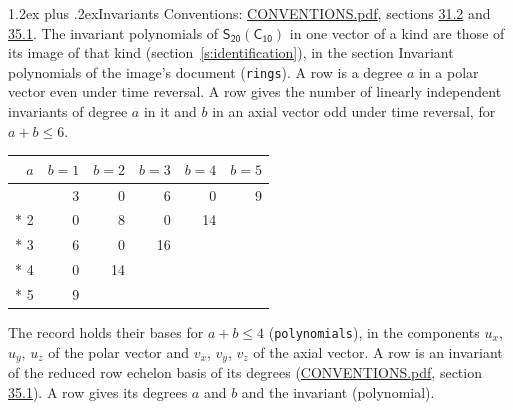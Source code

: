 \documentclass[10pt,a4paper]{article}
\makeatletter
\renewcommand\section{\@startsection{section}{1}{\z@}{-3ex plus -1ex minus -.2ex}%
  {1.2ex plus .2ex}{\normalfont\large\sffamily\bfseries\color{parttitle}}}
\numberwithin{equation}{section}
\newcommand{\grp}[1]{\mathsf{#1}}
\makeatother
\begin{document}
\section{Invariants}\label{s:invariants}
Conventions: \href{../../CONVENTIONS.pdf}{CONVENTIONS.pdf}, sections \href{../../CONVENTIONS.pdf\#conv.31.2}{31.2} and \href{../../CONVENTIONS.pdf\#conv.35.1}{35.1}.
The invariant polynomials of $\grp{S_{20}}(\grp{C_{10}})$ in one vector of a kind are those of its image of that kind (section~\ref{s:identification}), in the section Invariant polynomials of the image's document (\texttt{rings}).
\leavevmode\label{n:index.degree.polar}\label{n:index.degree.axial}A row is a degree $a$ in a polar vector even under time reversal. A row gives the number of linearly independent invariants of degree $a$ in it and $b$ in an axial vector odd under time reversal, for $a + b \le 6$.
{\small\begin{longtable}{@{}rrrrrr@{}}\toprule
$a$ & $b = 1$ & $b = 2$ & $b = 3$ & $b = 4$ & $b = 5$\\\midrule\endhead
\bottomrule\endfoot\endlastfoot
1 & 3 & 0 & 6 & 0 & 9\\*
2 & 0 & 8 & 0 & 14 & \\*
3 & 6 & 0 & 16 &  & \\*
4 & 0 & 14 &  &  & \\*
5 & 9 &  &  &  & \\
\bottomrule\end{longtable}}
\leavevmode\label{n:local.component.polar}\label{n:local.component.axial}The record holds their bases for $a + b \le 4$ (\texttt{polynomials}), in the components $u_{x}$, $u_{y}$, $u_{z}$ of the polar vector and $v_{x}$, $v_{y}$, $v_{z}$ of the axial vector. \label{n:head.polynomial}A row is an invariant of the reduced row echelon basis of its degrees (\href{../../CONVENTIONS.pdf}{CONVENTIONS.pdf}, section \href{../../CONVENTIONS.pdf\#conv.35.1}{35.1}). A row gives its degrees $a$ and $b$ and the invariant (polynomial).
\end{document}

